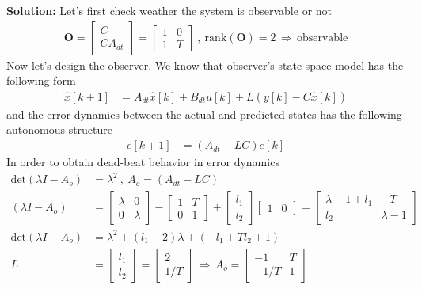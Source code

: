 \documentclass[twoside]{article}
\begin{document}
\begin{enumerate}
\textbf{Solution:} Let's first check weather the system is observable or not
%
\begin{align*}
\mathbf{O} = \left[ \begin{array}{cc} C \\ \hline C A_{dt} \end{array} \right] =
\left[ \begin{array}{cc} 1 & 0 \\ \hline 1 & T \end{array} \right]
\ , \ \mathrm{rank}( \mathbf{O} ) = 2 \, \Rightarrow \, \mathrm{observable}
\end{align*}
%
Now let's design the observer. We know that observer's state-space model has the following form
%
\begin{align*}
  \hat{x}[k+1] &= A_{dt} \hat{x}[k] + B_{dt} u[k] + L \left( y[k] - C \hat{x}[k] \right) 
\end{align*}
%
and the error dynamics between the actual and predicted states has the following autonomous structure
%
\begin{align*}
  e[k+1] &= ( A_{dt} - LC ) e[k]
\end{align*}
%
In order to obtain dead-beat behavior in error dynamics 
%
\begin{align*}
  \mathrm{det}( \lambda I -  A_o ) &= \lambda^2 \ , \ A_{o} = ( A_{dt} - LC )
  \\
  ( \lambda I -  A_o ) &= \begin{bmatrix} \lambda & 0 \\ 0 & \lambda \end{bmatrix} - \begin{bmatrix} 1 & T \\ 0 & 1 \end{bmatrix} 
  + \begin{bmatrix} l_1 \\ l_2 \end{bmatrix} \begin{bmatrix} 1 & 0 \end{bmatrix} 
  = \begin{bmatrix} \lambda - 1 + l_1 & -T \\ l_2 & \lambda - 1 \end{bmatrix} 
  \\
   \mathrm{det}( \lambda I -  A_o ) &= \lambda^2 + ( l_1 - 2 ) \lambda + ( -l_1 + T l_2 + 1 ) 
   \\
   L &= \begin{bmatrix} l_1 \\ l_2 \end{bmatrix} = \begin{bmatrix} 2 \\ 1/T \end{bmatrix} \, \Rightarrow \, A_o = \begin{bmatrix} -1 & T \\ -1/T & 1 \end{bmatrix} 
\end{align*}


\end{enumerate}
\end{document}
